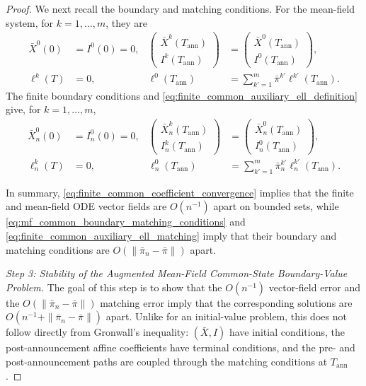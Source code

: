 \documentclass[12pt]{article}
\numberwithin{equation}{section}
\theoremstyle{definition}
\begin{document}
\begin{proof}
We next recall the boundary and matching conditions. For the mean-field
system, for \(k=1,\ldots,m\), they are
\begin{equation}\label{eq:mf_common_boundary_matching_conditions}
\begin{aligned}
\bar X^0(0)&=I^0(0)=0,
&
\begin{pmatrix}
\bar X^k(T_{\mathrm{ann}})\\
I^k(T_{\mathrm{ann}})
\end{pmatrix}
&=
\begin{pmatrix}
\bar X^0(T_{\mathrm{ann}})\\
I^0(T_{\mathrm{ann}})
\end{pmatrix},
\\
\ell^k(T)&=0,
&
\ell^0(T_{\mathrm{ann}})
&=
\sum_{k'=1}^m
\bar\pi^{k'}\ell^{k'}(T_{\mathrm{ann}}).
\end{aligned}
\end{equation}
The finite boundary conditions and
\eqref{eq:finite_common_auxiliary_ell_definition} give, for
\(k=1,\ldots,m\),
\begin{equation}\label{eq:finite_common_auxiliary_ell_matching}
\begin{aligned}
\bar X_n^0(0)&=I_n^0(0)=0,
&
\begin{pmatrix}
\bar X_n^k(T_{\mathrm{ann}})\\
I_n^k(T_{\mathrm{ann}})
\end{pmatrix}
&=
\begin{pmatrix}
\bar X_n^0(T_{\mathrm{ann}})\\
I_n^0(T_{\mathrm{ann}})
\end{pmatrix},
\\
\ell_n^k(T)&=0,
&
\ell_n^0(T_{\mathrm{ann}})
&=
\sum_{k'=1}^m
\bar\pi_n^{k'}\ell_n^{k'}(T_{\mathrm{ann}}).
\end{aligned}
\end{equation}

In summary, \eqref{eq:finite_common_coefficient_convergence} implies that the
finite and mean-field ODE vector fields are \(O(n^{-1})\) apart on bounded
sets, while \eqref{eq:mf_common_boundary_matching_conditions} and
\eqref{eq:finite_common_auxiliary_ell_matching} imply that their boundary and
matching conditions are \(O(\|\bar\pi_n-\bar\pi\|)\) apart.

\emph{Step 3: Stability of the Augmented Mean-Field Common-State
Boundary-Value Problem.}
The goal of this step is to show that the \(O(n^{-1})\) vector-field error and
the \(O(\|\bar\pi_n-\bar\pi\|)\) matching error imply that the corresponding
solutions are \(O(n^{-1}+\|\bar\pi_n-\bar\pi\|)\) apart.
Unlike for an initial-value problem, this does not follow directly from
Gronwall's inequality: \((\bar X,I)\) have initial conditions, the
post-announcement affine coefficients have terminal conditions, and the
pre- and post-announcement paths are coupled through the matching conditions
at \(T_{\mathrm{ann}}\).


\end{proof}
\end{document}
